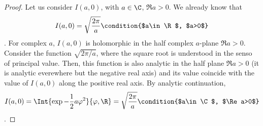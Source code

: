 \begin{proof}
   Let  us consider $I(a,0)$, with $a\in\C$, $\Re a >0$.
We already know that 
\begin{dmath*}
   I(a,0) = \sqrt{\frac{2\pi}{a}}  \condition{$a\in\R$, $a>0$}
\end{dmath*}.
For complex $a$, $I(a,0)$ is holomorphic in the half complex $a$-plane 
$\Re a>0$.
Consider the function $\sqrt{2\pi/a}$, where the square root is
understood in the senso of principal value. Then, this function is also
analytic in the half plane $\Re a>0$ (it is analytic everewhere but the
negative real axis) and its value coincide with the value of
$I(a,0)$ along the positive real axis.
By analytic continuation, 
\begin{dmath}[compact]%
   I(a,0) = \Int{\exp{-\frac{1}{2} a\varphi^{2}}}{\varphi,\R} =
   \sqrt{\frac{2\pi}{a}} \condition{$a\in\C$, $\Re a>0$}
\end{dmath}.


\end{proof}
